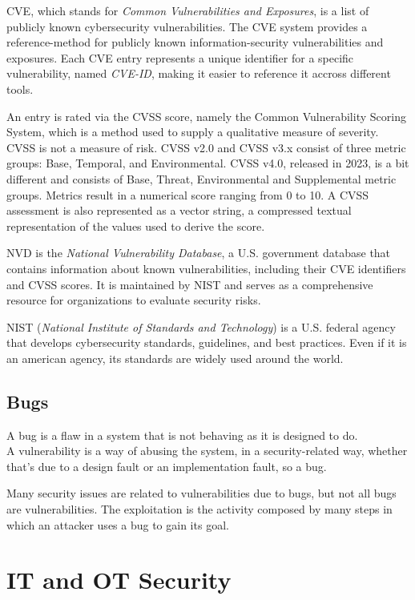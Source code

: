 CVE, which stands for \textit{Common Vulnerabilities and Exposures}, is a list of publicly known cybersecurity vulnerabilities. The CVE system provides a reference-method for publicly known information-security vulnerabilities and exposures. Each CVE entry represents a unique identifier for a specific vulnerability, named \textit{CVE-ID}, making it easier to reference it accross different tools.

An entry is rated via the CVSS score, namely the Common Vulnerability Scoring System, which is a method used to supply a qualitative measure of severity. CVSS is not a measure of risk. CVSS v2.0 and CVSS v3.x consist of three metric groups: Base, Temporal, and Environmental. CVSS v4.0, released in 2023, is a bit different and consists of Base, Threat, Environmental and Supplemental metric groups. Metrics result in a numerical score ranging from 0 to 10. A CVSS assessment is also represented as a vector string, a compressed textual representation of the values used to derive the score.~\cite{cvss-metrics}


NVD is the \textit{National Vulnerability Database}, a U.S. government database that contains information about known vulnerabilities, including their CVE identifiers and CVSS scores. It is maintained by NIST and serves as a comprehensive resource for organizations to evaluate security risks.

NIST (\textit{National Institute of Standards and Technology}) is a U.S. federal agency that develops cybersecurity standards, guidelines, and best practices. Even if it is an american agency, its standards are widely used around the world.

\subsection{Bugs}

A bug is a flaw in a system that is not behaving as it is designed to do.\\
A vulnerability is a way of abusing the system, in a security-related way, whether that's due to a design fault or an implementation fault, so a bug.

Many security issues are related to vulnerabilities due to bugs, but not all bugs are vulnerabilities. The exploitation is the activity composed by many steps in which an attacker uses a bug to gain its goal.

\section{IT and OT Security}

